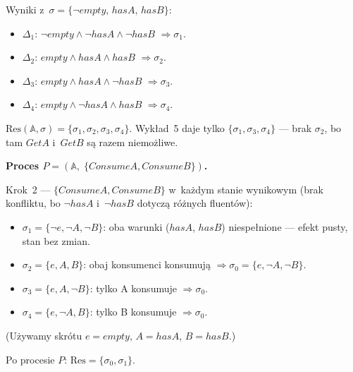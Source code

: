 \documentclass[11pt,a4paper]{article}
\begin{document}
\noindent Wyniki z~$\sigma = \{\neg\mathit{empty},\, \mathit{hasA},\, \mathit{hasB}\}$:
\begin{itemize}
  \item $\Delta_1$: $\neg\mathit{empty} \land \neg\mathit{hasA} \land \neg\mathit{hasB}$
        $\Rightarrow \sigma_1$.
  \item $\Delta_2$: $\mathit{empty} \land \mathit{hasA} \land \mathit{hasB}$
        $\Rightarrow \sigma_2$.
  \item $\Delta_3$: $\mathit{empty} \land \mathit{hasA} \land \neg\mathit{hasB}$
        $\Rightarrow \sigma_3$.
  \item $\Delta_4$: $\mathit{empty} \land \neg\mathit{hasA} \land \mathit{hasB}$
        $\Rightarrow \sigma_4$.
\end{itemize}

$\mathrm{Res}(\mathbb{A}, \sigma) = \{\sigma_1, \sigma_2, \sigma_3, \sigma_4\}$.
Wykład~5 daje tylko $\{\sigma_1, \sigma_3, \sigma_4\}$ --- brak $\sigma_2$,
bo tam $\mathit{GetA}$ i~$\mathit{GetB}$ są razem niemożliwe.

\medskip
\noindent\textbf{Proces $P = (\mathbb{A},\; \{\mathit{ConsumeA}, \mathit{ConsumeB}\})$.}

Krok~2 --- $\{\mathit{ConsumeA}, \mathit{ConsumeB}\}$ w~każdym stanie
wynikowym (brak konfliktu, bo $\neg\mathit{hasA}$ i~$\neg\mathit{hasB}$
dotyczą różnych fluentów):
\begin{itemize}
  \item $\sigma_1 = \{\neg e, \neg A, \neg B\}$:
        oba warunki ($\mathit{hasA}$, $\mathit{hasB}$) niespełnione
        --- efekt pusty, stan bez zmian.
  \item $\sigma_2 = \{e, A, B\}$: obaj konsumenci konsumują
        $\Rightarrow \sigma_0 = \{e, \neg A, \neg B\}$.
  \item $\sigma_3 = \{e, A, \neg B\}$: tylko A konsumuje
        $\Rightarrow \sigma_0$.
  \item $\sigma_4 = \{e, \neg A, B\}$: tylko B konsumuje
        $\Rightarrow \sigma_0$.
\end{itemize}

(Używamy skrótu $e = \mathit{empty}$, $A = \mathit{hasA}$, $B = \mathit{hasB}$.)

Po procesie $P$: $\mathrm{Res} = \{\sigma_0, \sigma_1\}$.
\end{document}
